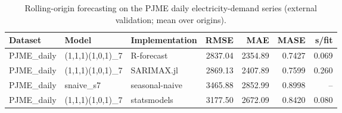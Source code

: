 \begin{table}[t]
\centering
\caption{Rolling-origin forecasting on the PJME daily electricity-demand series (external validation; mean over origins).}
\label{tab:energy_forecasting}
\begin{tabular}{lllrrrr}
\hline
Dataset & Model & Implementation & RMSE & MAE & MASE & s/fit \\
\hline
PJME\_daily & (1,1,1)(1,0,1)\_7 & R-forecast & 2837.04 & 2354.89 & 0.7427 & 0.069 \\
PJME\_daily & (1,1,1)(1,0,1)\_7 & SARIMAX.jl & 2869.13 & 2407.89 & 0.7599 & 0.260 \\
PJME\_daily & snaive\_s7 & seasonal-naive & 3465.88 & 2852.99 & 0.8998 & -- \\
PJME\_daily & (1,1,1)(1,0,1)\_7 & statsmodels & 3177.50 & 2672.09 & 0.8420 & 0.080 \\
\hline
\end{tabular}
\end{table}
